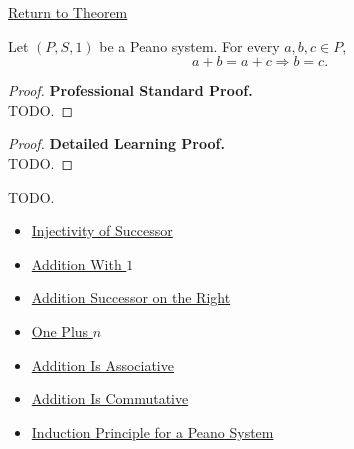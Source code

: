 \newpage
{}
\label{prf:addition-left-cancellation}

\begin{remark*}[Return]
\hyperref[thm:addition-left-cancellation]{Return to Theorem}
\end{remark*}

\begin{theorem*}
Let $(P,S,1)$ be a Peano system. For every $a,b,c \in P$,
\[
a+b=a+c
\Longrightarrow
b=c.
\]
\end{theorem*}

\begin{proof}
\textbf{Professional Standard Proof.}~\\
TODO.
\end{proof}

\begin{proof}
\textbf{Detailed Learning Proof.}~\\
TODO.
\end{proof}

\begin{remark*}
TODO.
\end{remark*}

\begin{dependencies}
\begin{itemize}
  \item \hyperref[ax:peano-successor-injective]{Injectivity of Successor}
  \item \hyperref[thm:addition-with-one]{Addition With $1$}
  \item \hyperref[thm:addition-successor-on-right]{Addition Successor on the Right}
  \item \hyperref[thm:one-plus-n]{One Plus $n$}
  \item \hyperref[thm:addition-associative]{Addition Is Associative}
  \item \hyperref[thm:addition-commutative]{Addition Is Commutative}
  \item \hyperref[thm:induction-principle-for-peano-system]{Induction Principle for a Peano System}
\end{itemize}
\end{dependencies}
